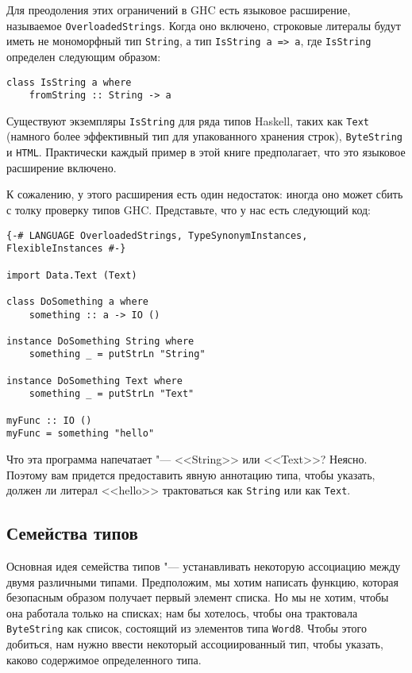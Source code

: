 Для преодоления этих ограничений в GHC есть языковое расширение, называемое \lstinline'OverloadedStrings'. Когда оно включено, строковые литералы будут иметь не мономорфный тип \lstinline'String', а тип \lstinline'IsString a => a', где \lstinline'IsString' определен следующим образом:

\begin{lstlisting}
class IsString a where
    fromString :: String -> a
\end{lstlisting}

Существуют экземпляры \lstinline'IsString' для ряда типов Haskell, таких как \lstinline'Text' (намного более эффективный тип для упакованного хранения строк), \lstinline'ByteString' и \lstinline'HTML'. Практически каждый пример в этой книге предполагает, что это языковое расширение включено.

К сожалению, у этого расширения есть один недостаток: иногда оно может сбить с толку проверку типов GHC. Представьте, что у нас есть следующий код:

\begin{lstlisting}
{-# LANGUAGE OverloadedStrings, TypeSynonymInstances, FlexibleInstances #-}

import Data.Text (Text)

class DoSomething a where
    something :: a -> IO ()

instance DoSomething String where
    something _ = putStrLn "String"

instance DoSomething Text where
    something _ = putStrLn "Text"

myFunc :: IO ()
myFunc = something "hello"
\end{lstlisting}

Что эта программа напечатает "--- <<String>> или <<Text>>? Неясно. Поэтому вам придется предоставить явную аннотацию типа, чтобы указать, должен ли литерал <<hello>> трактоваться как \lstinline'String' или как \lstinline'Text'.

\subsection{Семейства типов}

Основная идея семейства типов "--- устанавливать некоторую ассоциацию между двумя различными типами. Предположим, мы хотим написать функцию, которая безопасным образом получает первый элемент списка. Но мы не хотим, чтобы она работала только на списках; нам бы хотелось, чтобы она трактовала \lstinline'ByteString' как список, состоящий из элементов типа \lstinline'Word8'. Чтобы этого добиться, нам нужно ввести некоторый ассоциированный тип, чтобы указать, каково содержимое определенного типа.

